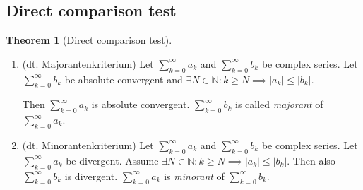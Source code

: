 \documentclass[a4paper,landscape,twocolumn]{article}
\theoremstyle{definition}
\newtheorem{theorem}{Theorem}
\newcommand\abs[1]{\left|#1\right|}
\begin{document}
\subsection{Direct comparison test}
\begin{theorem}[Direct comparison test] \hfill{}
  \begin{enumerate}
    \item
      (dt. \foreignlanguage{ngerman}{Majorantenkriterium})
      Let $\sum_{k=0}^\infty a_k$ and $\sum_{k=0}^\infty b_k$ be complex series.
      Let $\sum_{k=0}^\infty b_k$ be absolute convergent and $\exists N \in \mathbb N: k \geq N
      \implies \abs{a_k} \leq \abs{b_k}$.

      Then $\sum_{k=0}^\infty a_k$ is absolute convergent.
      $\sum_{k=0}^\infty b_k$ is called \emph{majorant} of $\sum_{k=0}^\infty a_k$.

    \item
      (dt. \foreignlanguage{ngerman}{Minorantenkriterium})
      Let $\sum_{k=0}^\infty a_k$ and $\sum_{k=0}^\infty b_k$ be complex series.
      Let $\sum_{k=0}^\infty a_k$ be divergent.
      Assume $\exists N \in \mathbb N: k \geq N \implies \abs{a_k} \leq \abs{b_k}$.
      Then also $\sum_{k=0}^\infty b_k$ is divergent.
      $\sum_{k=0}^\infty a_k$ is \emph{minorant} of $\sum_{k=0}^\infty b_k$.
  \end{enumerate}
\end{theorem}
\end{document}

